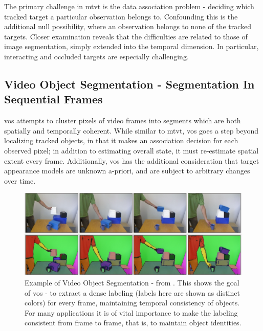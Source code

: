 The primary challenge in \gls{mtvt} is the data association problem - deciding which tracked target a particular observation belongs to. Confounding this is the additional null possibility, where an observation belongs to none of the tracked targets. Closer examination reveals that the difficulties are related to those of image segmentation, simply extended into the temporal dimension. In particular, interacting and occluded targets are especially challenging.

\subsection{Video Object Segmentation - Segmentation In Sequential Frames}
\gls{vos} attempts to cluster pixels of video frames into segments which are both spatially and temporally coherent. While similar to \gls{mtvt}, \gls{vos} goes a step beyond localizing tracked objects, in that it makes an association decision for each observed pixel; in addition to estimating overall state, it must re-estimate spatial extent every frame. Additionally, \gls{vos} has the additional consideration that target appearance models are unknown a-priori, and are subject to arbitrary changes over time. 

\begin{figure}
\label{fig:ExampleSegmentation}
\centering
\includegraphics[width=\linewidth]{figures/Introduction/Video_Segmentation.pdf}
\caption[Example of Video Object Segmentation]{Example of Video Object Segmentation - from \cite{Abramov_WACV12}. This shows the goal of \gls{vos} - to extract a dense labeling (labels here are shown as distinct colors) for every frame, maintaining temporal consistency of objects. For many applications it is of vital importance to make the labeling consistent from frame to frame, that is, to maintain object identities.}
\end{figure}

